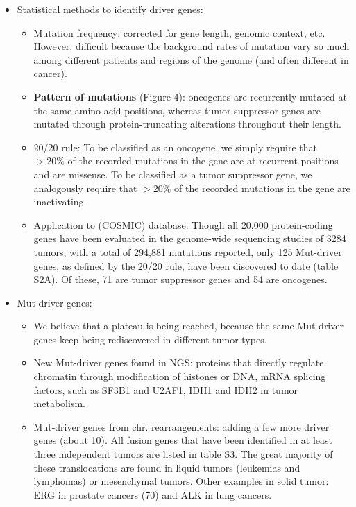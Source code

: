 \documentclass{report}
\begin{document}
\begin{itemize}
	\item Statistical methods to identify driver genes: 
	\begin{itemize}
		\item Mutation frequency: corrected for gene length, genomic context, etc. However, difficult because the background rates of mutation vary so much among different patients and regions of the genome (and often different in cancer). 
		\item \textbf{Pattern of mutations} (Figure 4): oncogenes are recurrently mutated at the same amino acid positions, whereas tumor suppressor genes are mutated through protein-truncating alterations throughout their length. 
		\item 20/20 rule: To be classified as an oncogene, we simply require that $>20\%$ of the recorded mutations in the gene are at recurrent positions and are missense. To be classified as a tumor suppressor gene, we analogously require that $>20\%$ of the recorded mutations in the gene are inactivating.
		\item Application to (COSMIC) database. Though all 20,000 protein-coding genes have been evaluated in the genome-wide sequencing studies of 3284 tumors, with a total of 294,881 mutations reported, only 125 Mut-driver genes, as defined by the 20/20 rule, have been discovered to date (table S2A). Of these, 71 are tumor suppressor genes and 54 are oncogenes.
	\end{itemize}
	
	\item Mut-driver genes: 
	\begin{itemize}
		\item We believe that a plateau is being reached, because the same Mut-driver genes keep being rediscovered in different tumor types. 
		\item New Mut-driver genes found in NGS: proteins that directly regulate chromatin through modification of histones or DNA, mRNA splicing factors, such as SF3B1 and U2AF1, IDH1 and IDH2 in tumor metabolism. 
		\item Mut-driver genes from chr. rearrangements: adding a few more driver genes (about 10). All fusion genes that have been identified in at least three independent tumors are listed in table S3. The great majority of these translocations are found in liquid tumors (leukemias and lymphomas) or mesenchymal tumors. Other examples in solid tumor: ERG in prostate cancers (70) and ALK in lung cancers. 
	\end{itemize}
	

\end{itemize}
\end{document}
